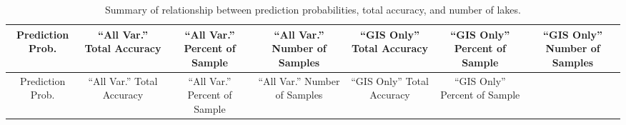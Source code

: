 \documentclass[12pt,]{article}
\begin{document}
\begin{longtable}[c]{@{}ccccccc@{}}
\caption{Summary of relationship between prediction probabilities, total
accuracy, and number of lakes. \label{tab:cond_prob_tab}}\tabularnewline
\toprule
\begin{minipage}[b]{0.08\columnwidth}\centering\strut
Prediction Prob.
\strut\end{minipage} &
\begin{minipage}[b]{0.11\columnwidth}\centering\strut
``All Var.'' Total Accuracy
\strut\end{minipage} &
\begin{minipage}[b]{0.13\columnwidth}\centering\strut
``All Var.'' Percent of Sample
\strut\end{minipage} &
\begin{minipage}[b]{0.13\columnwidth}\centering\strut
``All Var.'' Number of Samples
\strut\end{minipage} &
\begin{minipage}[b]{0.11\columnwidth}\centering\strut
``GIS Only'' Total Accuracy
\strut\end{minipage} &
\begin{minipage}[b]{0.13\columnwidth}\centering\strut
``GIS Only'' Percent of Sample
\strut\end{minipage} &
\begin{minipage}[b]{0.13\columnwidth}\centering\strut
``GIS Only'' Number of Samples
\strut\end{minipage}\tabularnewline
\midrule
\endfirsthead
\toprule
\begin{minipage}[b]{0.08\columnwidth}\centering\strut
Prediction Prob.
\strut\end{minipage} &
\begin{minipage}[b]{0.11\columnwidth}\centering\strut
``All Var.'' Total Accuracy
\strut\end{minipage} &
\begin{minipage}[b]{0.13\columnwidth}\centering\strut
``All Var.'' Percent of Sample
\strut\end{minipage} &
\begin{minipage}[b]{0.13\columnwidth}\centering\strut
``All Var.'' Number of Samples
\strut\end{minipage} &
\begin{minipage}[b]{0.11\columnwidth}\centering\strut
``GIS Only'' Total Accuracy
\strut\end{minipage} &
\begin{minipage}[b]{0.13\columnwidth}\centering\strut
``GIS Only'' Percent of Sample

\end{minipage}
\end{longtable}
\end{document}
